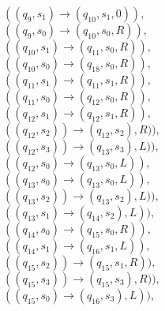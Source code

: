\documentclass{article} %
\begin{document}
\begin{center}
\begin{varwidth}{\textwidth}
\begin{tasks}[label={},label-width={1cm}]
                $((q_{9}, s_{1}) \to (q_{10}, s_{1}, 0)),$\\
                $((q_{9}, s_{0}) \to (q_{10}, s_{0}, R)),$\\
                $((q_{10}, s_{1}) \to (q_{11}, s_{0}, R)),$\\
                $((q_{10}, s_{0}) \to (q_{18}, s_{0}, R)),$\\
                $((q_{11}, s_{1}) \to (q_{11}, s_{1}, R)),$\\
                $((q_{11}, s_{0}) \to (q_{12}, s_{0}, R)),$\\
                $((q_{12}, s_{1}) \to (q_{12}, s_{1}, R)),$\\
                $((q_{12}, s_{2})) \to (q_{12}, s_{2}), R)),$\\
                $((q_{12}, s_{3})) \to (q_{13}, s_{3}), L)),$\\
                $((q_{12}, s_{0}) \to (q_{13}, s_{0}, L)),$\\
                $((q_{13}, s_{0}) \to (q_{13}, s_{0}, L)),$\\
                $((q_{13}, s_{2})) \to (q_{13}, s_{2}), L)),$\\
                $((q_{13}, s_{1}) \to (q_{14}, s_{2}), L)),$\\
                $((q_{14}, s_{0}) \to (q_{15}, s_{0}, R)),$\\
                $((q_{14}, s_{1}) \to (q_{16}, s_{1}, L)),$\\
                $((q_{15}, s_{2})) \to (q_{15}, s_{1}, R)),$\\
                $((q_{15}, s_{3})) \to (q_{15}, s_{3}), R)),$\\
                $((q_{15}, s_{0}) \to (q_{16}, s_{3}), L)),$\\


\end{tasks}
\end{varwidth}
\end{center}
\end{document}
